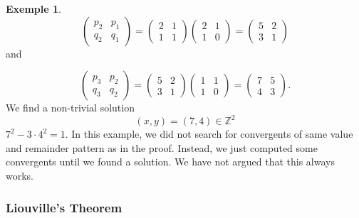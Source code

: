 \documentclass[a4paper,11pt,american]{article}
\theoremstyle{plain}
\theoremstyle{definition}
\newtheorem{example}{Exemple}
\begin{document}
\begin{example}
    \begin{displaymath}
      \begin{pmatrix}
        p_{2} & p_{1}  \\
        q_{2} & q_{1}  
      \end{pmatrix} =
      \begin{pmatrix}
        2 & 1  \\
        1 & 1  
      \end{pmatrix}
       \begin{pmatrix}
        2 & 1  \\
        1 & 0  
      \end{pmatrix}  =
      \begin{pmatrix}
        5 & 2  \\
        3 & 1  
      \end{pmatrix} 
    \end{displaymath}
    and
    
    \begin{displaymath}
      \begin{pmatrix}
        p_{3} & p_{2}  \\
        q_{3} & q_{2}  
      \end{pmatrix} =
      \begin{pmatrix}
        5 & 2  \\
        3 & 1  
      \end{pmatrix}
       \begin{pmatrix}
        1 & 1  \\
        1 & 0  
      \end{pmatrix}  =
      \begin{pmatrix}
        7 & 5  \\
        4 & 3  
      \end{pmatrix}. 
    \end{displaymath}
    We find a non-trivial solution
    \begin{displaymath}
      (x,y) = (7,4)  ∈ℤ^2
    \end{displaymath}
    $7^2 - 3⋅ 4^2 = 1$. In this example, we did not search for convergents of same value and remainder pattern as in the proof. Instead, we just computed some convergents until we found a solution. We have not argued that  this always works. 
  \end{example}


\subsubsection*{Liouville's Theorem}
\end{document}
